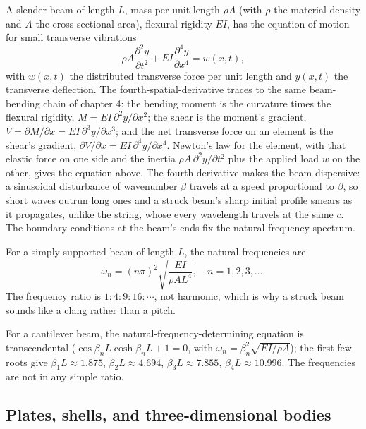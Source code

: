 A slender beam of length $L$, mass per unit length $\rho A$ (with
$\rho$ the material density and $A$ the cross-sectional area),
flexural rigidity $EI$, has the equation of motion for small
transverse vibrations
\[
\rho A \frac{\partial^2 y}{\partial t^2} + EI \frac{\partial^4 y}{
\partial x^4} = w(x, t),
\]
with $w(x, t)$ the distributed transverse force per unit length and
$y(x, t)$ the transverse deflection. The fourth-spatial-derivative
traces to the same beam-bending chain of chapter 4: the bending moment
is the curvature times the flexural rigidity, $M = EI\,\partial^2
y/\partial x^2$; the shear is the moment's gradient, $V = \partial
M/\partial x = EI\,\partial^3 y/\partial x^3$; and the net transverse
force on an element is the shear's gradient, $\partial V/\partial x =
EI\,\partial^4 y/\partial x^4$. Newton's law for the element, with that
elastic force on one side and the inertia $\rho A\,\partial^2 y/\partial
t^2$ plus the applied load $w$ on the other, gives the equation above.
The fourth derivative
makes the beam dispersive: a sinusoidal disturbance of wavenumber $\beta$
travels at a speed proportional to $\beta$, so short waves outrun long
ones and a struck beam's sharp initial profile smears as it propagates,
unlike the string, whose every wavelength travels at the same $c$.
The boundary conditions at the beam's ends fix the natural-frequency
spectrum.

For a simply supported beam of length $L$, the natural frequencies
are
\[
\omega_n = (n\pi)^2 \sqrt{\frac{EI}{\rho A L^4}}, \quad n = 1, 2, 3,
\ldots.
\]
The frequency ratio is $1 : 4 : 9 : 16 : \cdots$, not harmonic, which
is why a struck beam sounds like a clang rather than a pitch.

For a cantilever beam, the natural-frequency-determining equation
is transcendental ($\cos\beta_n L \cosh\beta_n L + 1 = 0$, with
$\omega_n = \beta_n^2 \sqrt{EI/\rho A}$); the first few roots give
$\beta_1 L \approx 1.875$, $\beta_2 L \approx 4.694$, $\beta_3 L
\approx 7.855$, $\beta_4 L \approx 10.996$. The frequencies are not
in any simple ratio.

\subsection{Plates, shells, and three-dimensional bodies}

